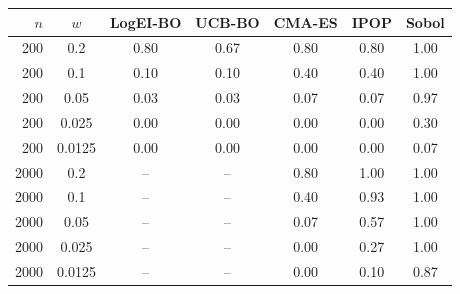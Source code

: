 \begin{tabular}{rcccccc}
\toprule
$n$ & $w$ & LogEI-BO & UCB-BO & CMA-ES & IPOP & Sobol \\
\midrule
200 & 0.2 & 0.80 & 0.67 & 0.80 & 0.80 & 1.00 \\
200 & 0.1 & 0.10 & 0.10 & 0.40 & 0.40 & 1.00 \\
200 & 0.05 & 0.03 & 0.03 & 0.07 & 0.07 & 0.97 \\
200 & 0.025 & 0.00 & 0.00 & 0.00 & 0.00 & 0.30 \\
200 & 0.0125 & 0.00 & 0.00 & 0.00 & 0.00 & 0.07 \\
2000 & 0.2 & -- & -- & 0.80 & 1.00 & 1.00 \\
2000 & 0.1 & -- & -- & 0.40 & 0.93 & 1.00 \\
2000 & 0.05 & -- & -- & 0.07 & 0.57 & 1.00 \\
2000 & 0.025 & -- & -- & 0.00 & 0.27 & 1.00 \\
2000 & 0.0125 & -- & -- & 0.00 & 0.10 & 0.87 \\
\bottomrule
\end{tabular}
